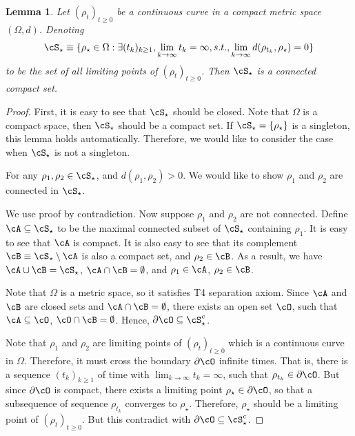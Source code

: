\documentclass[11pt]{article}
\newtheorem{lemma}{Lemma}
\begin{document}
\begin{lemma}\label{lem:ConnectedLimitingSet}
Let $(\rho_t)_{t \ge 0}$ be a continuous curve in a compact metric space $(\Omega, d)$. Denoting 
\[
\cS_\star \equiv \{ \rho_\star \in \Omega: \exists ( t_k )_{k \ge 1}, \lim_{k\to \infty} t_k = \infty, s.t., \lim_{k \to \infty} d(\rho_{t_k}, \rho_\star) = 0 \}
\]
to be the set of all limiting points of $(\rho_t)_{t \ge 0}$. Then $\cS_\star$ is a connected compact set.  
\end{lemma}
%
\begin{proof}
First, it is easy to see that $\cS_\star$ should be closed. Note that $\Omega$ is a compact space, then $\cS_\star$ should be a compact set. If $\cS_\star = \{ \rho_\star \}$ is a singleton, this lemma holds automatically. Therefore, we would like to consider the case when $\cS_\star$ is not a singleton. 

For any $\rho_1, \rho_2 \in \cS_\star$, and  $d(\rho_1, \rho_2) > 0$. We would like to show $\rho_1$ and $\rho_2$ are connected in $\cS_\star$. 

We use proof by contradiction. Now suppose $\rho_1$ and $\rho_2$ are not connected. Define $\cA \subseteq \cS_\star$ to be the maximal connected subset of $\cS_\star$ containing $\rho_1$. It is easy to see that $\cA$ is compact. It is also easy to see that its complement $\cB \equiv \cS_\star \setminus \cA$ is also a compact set, and $\rho_2 \in \cB$. As a result, we have $\cA \cup \cB = \cS_\star$, $\cA \cap \cB = \emptyset$, and $\rho_1 \in \cA$, $\rho_2 \in \cB$. 

Note that $\Omega$ is a metric space, so it satisfies T4 separation axiom. Since $\cA$ and $\cB$ are closed sets and $\cA \cap \cB = \emptyset$, there exists an open set $\cO$, such that $\cA \subseteq \cO$, $\cO \cap \cB = \emptyset$. Hence, $\partial\cO \subseteq  \cS_\star^c$. 

Note that $\rho_1$ and $\rho_2$ are limiting points of $(\rho_t)_{t \ge 0}$ which is a continuous curve in $\Omega$. Therefore, it must cross the boundary $\partial \cO$ infinite times. That is, there is a sequence $(t_k)_{k \ge 1}$ of time with $\lim_{k \to \infty} t_k = \infty$,  such that $\rho_{t_k} \in \partial \cO$. But since $\partial \cO$ is compact, there exists a limiting point $\rho_\star \in \partial \cO$, so that a subsequence of sequence $\rho_{t_k}$ converges to $\rho_\star$. Therefore, $\rho_\star$ should be a limiting point of $(\rho_{t})_{t\ge 0}$. But this contradict with $\partial \cO \subseteq \cS_\star^c$. 
\end{proof}
\end{document}

